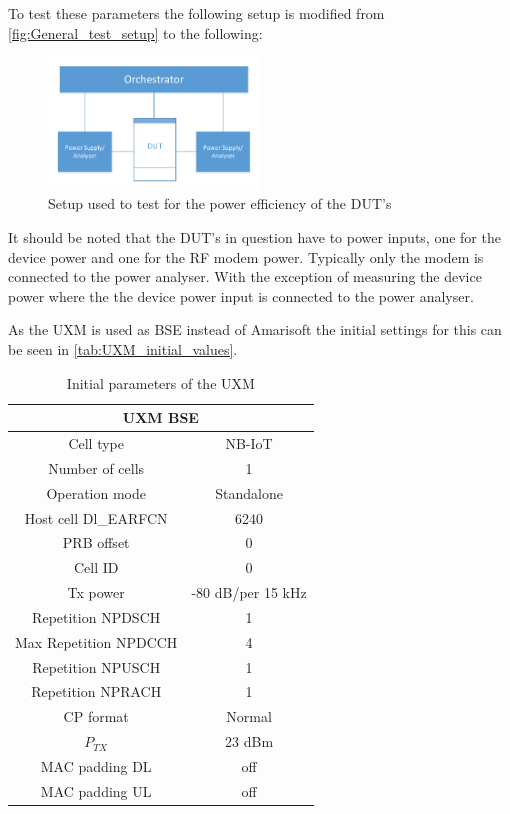 To test these parameters the following setup is modified from \autoref{fig:General_test_setup} to the following:

\begin{figure}[H]
\centering
\includegraphics[width=0.5\textwidth]{figures/IPE_test_setup.pdf}
\caption{Setup used to test for the power efficiency of the \gls{DUT}'s}
\label{fig:IPE_test_setup}
\end{figure}

It should be noted that the \gls{DUT}'s in question have to power inputs, one for the device power and one for the RF modem power. Typically only the modem is connected to the power analyser. With the exception of measuring the device power where the the device power input is connected to the power analyser.

As the UXM is used as \gls{BSE} instead of Amarisoft the initial settings for this can be seen in \autoref{tab:UXM_initial_values}.

\begin{table}[H]
\centering
\begin{tabular}{|c|c|} \hline
\multicolumn{2}{|c|}{\textbf{UXM \gls{BSE}}} \\ \hline
Cell type			 & NB-IoT         \\ \hline
Number of cells		 & 1              \\ \hline
Operation mode		 & Standalone     \\ \hline
Host cell Dl\_EARFCN & 6240           \\ \hline
PRB offset			 & 0	          \\ \hline
Cell ID				 & 0              \\ \hline
Tx power			 & -80 dB/per 15 kHz \\ \hline
Repetition NPDSCH	 & 1	          \\ \hline
Max Repetition NPDCCH & 4	          \\ \hline
Repetition NPUSCH	 & 1	          \\ \hline
Repetition NPRACH	 & 1	          \\ \hline
CP format			 & Normal         \\ \hline
$P_{TX}$				 & 23 dBm         \\ \hline
MAC padding DL		 & off       	  \\ \hline
MAC padding UL		 & off       	  \\ \hline
\end{tabular}
\caption{Initial parameters of the UXM}
\label{tab:UXM_initial_values}
\end{table}


